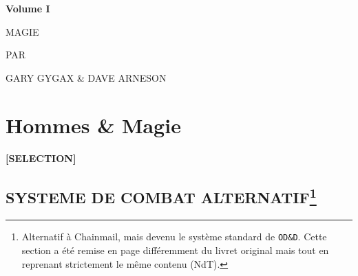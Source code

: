 \newpage
{}\begin{center}
{\Huge {}}{\normalsize \textsuperscript{\sffamily\textregistered}}

\vspace{1.8cm}

{\Large \textbf{Volume I}}

\vspace{1.3cm}

{\Huge {} MAGIE}

\vspace{5cm}

{\large PAR

\vspace{0.1cm}

GARY GYGAX \& DAVE ARNESON}
\end{center}

\newpage
\phantom{-}
\newpage


\section*{Hommes \& Magie}

\begin{center}
\textbf{[SELECTION]}
\end{center}

\subsection*{SYSTEME DE COMBAT ALTERNATIF\footnote{Alternatif à Chainmail, mais devenu le système standard de \texttt{OD\&D}. Cette section a été remise en page différemment du livret original mais tout en reprenant strictement le même contenu (NdT).}}

